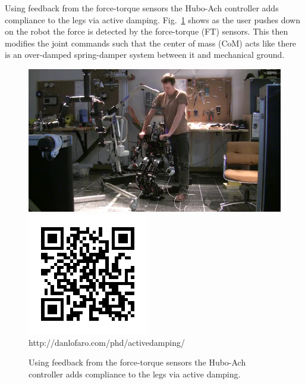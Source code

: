 Using feedback from the force-torque sensors the Hubo-Ach controller adds compliance to the legs via active damping.
Fig.~\ref{fig:activedamping} shows as the user pushes down on the robot the force is detected by the force-torque (FT) sensors.
This then modifies the joint commands such that the center of mass (CoM) acts like there is an over-damped spring-damper system between it and mechanical ground.

\begin{figure}[thpb]
  \centering
\includegraphics[width=0.6\columnwidth]{./pix/activedamping.png}
\includegraphics[width=0.3\columnwidth]{./qrcode/qrcode-activedamping.png}\\
     http://danlofaro.com/phd/activedamping/
  \caption{Using feedback from the force-torque sensors the Hubo-Ach controller adds compliance to the legs via active damping. }
  \label{fig:activedamping}
\end{figure}
